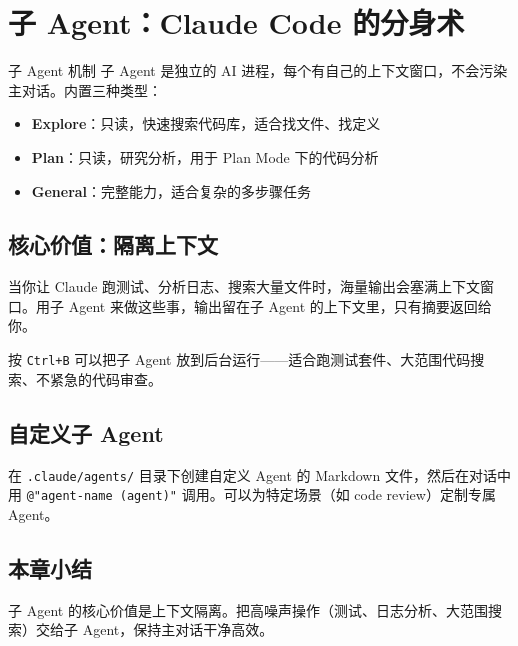 \section{子 Agent：Claude Code 的分身术}

\begin{knowledgebox}{子 Agent 机制}
子 Agent 是独立的 AI 进程，每个有自己的上下文窗口，不会污染主对话。内置三种类型：
\begin{itemize}[leftmargin=1.5em]
  \item \textbf{Explore}：只读，快速搜索代码库，适合找文件、找定义
  \item \textbf{Plan}：只读，研究分析，用于 Plan Mode 下的代码分析
  \item \textbf{General}：完整能力，适合复杂的多步骤任务
\end{itemize}
\end{knowledgebox}

\subsection{核心价值：隔离上下文}

当你让 Claude 跑测试、分析日志、搜索大量文件时，海量输出会塞满上下文窗口。用子 Agent 来做这些事，输出留在子 Agent 的上下文里，只有摘要返回给你。

按 \texttt{Ctrl+B} 可以把子 Agent 放到后台运行——适合跑测试套件、大范围代码搜索、不紧急的代码审查。

\subsection{自定义子 Agent}

在 \texttt{.claude/agents/} 目录下创建自定义 Agent 的 Markdown 文件，然后在对话中用 \texttt{@"agent-name (agent)"} 调用。可以为特定场景（如 code review）定制专属 Agent。

\subsection{本章小结}

子 Agent 的核心价值是上下文隔离。把高噪声操作（测试、日志分析、大范围搜索）交给子 Agent，保持主对话干净高效。

